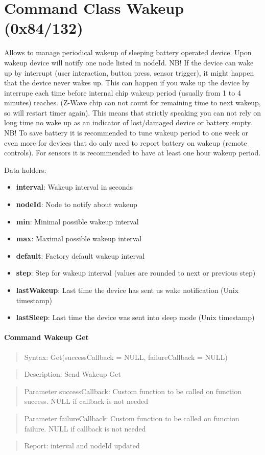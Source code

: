 \section{Command Class Wakeup (0x84/132)}

Allows to manage periodical wakeup of sleeping battery operated device. Upon wakeup device will notify one node listed in nodeId. NB! If the device can wake up by interrupt (user interaction, button press, sensor trigger), it might happen that the device never wakes up. This can happen if you wake up the device by interrupe each time before internal chip wakeup period (usually from 1 to 4 minutes) reaches. (Z-Wave chip can not count for remaining time to next wakeup, so will restart timer again). This means that strictly speaking you can not rely on long time no wake up as an indicator of lost/damaged device or battery empty. NB! To save battery it is recommended to tune wakeup period to one week or even more for devices that do only need to report battery on wakeup (remote controls). For sensors it is recommended to have at least one hour wakeup period.
\newline

\noindent
Data holders:

\begin{itemize}
\item \textbf{interval}: Wakeup interval in seconds
\item \textbf{nodeId}: Node to notify about wakeup
\item \textbf{min}: Minimal possible wakeup interval
\item \textbf{max}: Maximal possible wakeup interval
\item \textbf{default}: Factory default wakeup interval
\item \textbf{step}: Step for wakeup interval (values are rounded to next or previous step)
\item \textbf{lastWakeup}: Last time the device has sent us wake notification (Unix timestamp)
\item \textbf{lastSleep}: Last time the device was sent into sleep mode (Unix timestamp)
\end{itemize}

\paragraph{Command Wakeup Get}
\begin{quote}Syntax: Get(successCallback = NULL, failureCallback = NULL)\end{quote}
\begin{quote}Description: Send Wakeup Get\end{quote}
\begin{quote}Parameter successCallback: Custom function to be called on function success. NULL if callback is not needed\end{quote}
\begin{quote}Parameter failureCallback: Custom function to be called on function failure. NULL if callback is not needed\end{quote}
\begin{quote}Report: interval and nodeId updated\end{quote}


